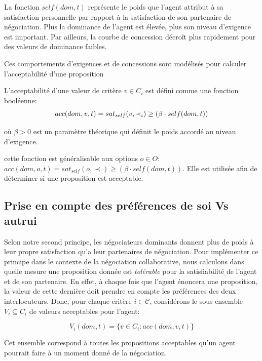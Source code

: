 	La fonction $self(dom,t)$ représente le poids que l'agent attribut à sa satisfaction personnelle par rapport à la satisfaction de son partenaire de négociation. Plus la dominance de l'agent est élevée, plus son niveau d'exigence est important. Par ailleurs, la courbe de concession décroît plus rapidement pour des valeurs de dominance faibles.
	
	Ces comportements d'exigences et de concessions sont modélisés pour calculer l'acceptabilité d'une proposition 
	
	L'acceptabilité d'une valeur de critère $v \in C_i$ est défini comme une fonction booléenne:
	\begin{equation}
	\vspace{-.5em} 
	acc(dom,v, t) = sat_{self}(v, \prec_i) \geq  (\beta \cdot self(dom,t))
	\end{equation}
	
	\medskip
	où $\beta>0$ est un paramètre théorique qui définit le poids accordé au niveau d'exigence.
	
	cette fonction est généralisable aux options $o \in O$: $acc(dom,o, t) = sat_{self}(o, \prec) \geq  (\beta \cdot self(dom,t))$. Elle est utilisée afin de déterminer si une proposition est acceptable.
	
	
	
	
	\subsection {Prise en compte des préférences de soi Vs autrui}
	Selon notre second principe, les négociateurs dominants donnent plus de poids à leur propre satisfaction qu'a leur partenaires de négociation. 
	Pour implémenter ce principe dans le contexte de la négociation collaborative, nous calculons dans quelle mesure une proposition donnée est \emph{tolérable} pour la satisfiabilité de l'agent et de son partenaire.
	En effet, à chaque fois que l'agent énoncera une proposition, la valeur de cette dernière doit prendre en compte les préférences des deux interlocuteurs. 
	Donc, pour chaque critère $i\in\mathcal{C}$, considérons le sous ensemble $V_i\subseteq C_i$ de valeurs acceptables pour l'agent:

	\begin{equation}
	V_i(dom,t) = \{ v\in C_i : acc(dom,v,t) \}
	\end{equation}
	
	Cet ensemble correspond à toutes les propositions acceptables qu'un agent pourrait faire à un moment donné de la négociation.
	
